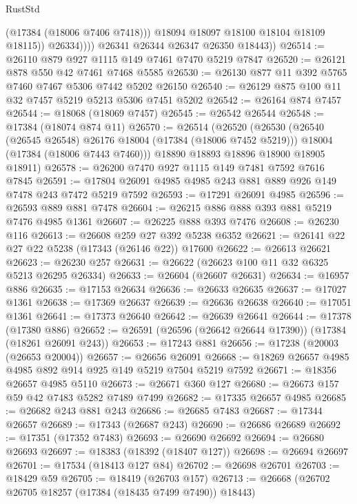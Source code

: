 \begin{lexlean}{RustStd}
\begin{coremodule}
                      (@17384 (@18006 @7406 @7418)))
                    @18094
                    @18097
                    @18100
                    @18104
                    @18109
                    @18115))
                @26334))))
        @26341
        @26344
        @26347
        @26350
        @18443))
@26514 := @26110 @879 @927 @1115 @149 @7461 @7470 @5219 @7847
@26520 := @26121 @878 @550 @42 @7461 @7468 @5585
@26530 := @26130 @877 @11 @392 @5765 @7460 @7467 @5306 @7442 @5202 @26150
@26540 := @26129 @875 @100 @11 @32 @7457 @5219 @5213 @5306 @7451 @5202
@26542 := @26164 @874 @7457
@26544 := @18068 (@18069 @7457)
@26545 := @26542 @26544
@26548 := @17384 (@18074 @874 @11)
@26570 := @26514
    (@26520
      (@26530
        (@26540 (@26545 @26548) @26176 @18004 (@17384 (@18006 @7452 @5219)))
        @18004
        (@17384 (@18006 @7443 @7460)))
      @18890
      @18893
      @18896
      @18900
      @18905
      @18911)
@26578 := @26200 @7470 @927 @1115 @149 @7481 @7592 @7616 @7845
@26591 := @17804 @26091 @4985 @4985 @243 @881 @889 @926 @149 @7478 @243 @7472 @5219 @7592
@26593 := @17291 @26091 @4985
@26596 := @26593 @889 @881 @7478
@26604 := @26215 @886 @888 @393 @881 @5219 @7476 @4985 @1361
@26607 := @26225 @888 @393 @7476
@26608 := @26230 @116
@26613 := @26608 @259 @27 @392 @5238 @6352
@26621 := @26141 @22 @27 @22 @5238 (@17343 (@26146 @22)) @17600
@26622 := @26613 @26621
@26623 := @26230 @257
@26631 := @26622 (@26623 @100 @11 @32 @6325 @5213 @26295 @26334)
@26633 := @26604 (@26607 @26631)
@26634 := @16957 @886
@26635 := @17153 @26634
@26636 := @26633 @26635
@26637 := @17027 @1361
@26638 := @17369 @26637
@26639 := @26636 @26638
@26640 := @17051 @1361
@26641 := @17373 @26640
@26642 := @26639 @26641
@26644 := @17378 (@17380 @886)
@26652 := @26591 (@26596 (@26642 @26644 @17390)) (@17384 (@18261 @26091 @243))
@26653 := @17243 @881
@26656 := @17238 (@20003 (@26653 @20004))
@26657 := @26656 @26091
@26668 := @18269 @26657 @4985 @4985 @892 @914 @925 @149 @5219 @7504 @5219 @7592
@26671 := @18356 @26657 @4985 @5110
@26673 := @26671 @360 @127
@26680 := @26673 @157 @59 @42 @7483 @5282 @7489 @7499
@26682 := @17335 @26657 @4985
@26685 := @26682 @243 @881 @243
@26686 := @26685 @7483
@26687 := @17344 @26657
@26689 := @17343 (@26687 @243)
@26690 := @26686 @26689
@26692 := @17351 (@17352 @7483)
@26693 := @26690 @26692
@26694 := @26680 @26693
@26697 := @18383 (@18392 (@18407 @127))
@26698 := @26694 @26697
@26701 := @17534 (@18413 @127 @84)
@26702 := @26698 @26701
@26703 := @18429 @59
@26705 := @18419 (@26703 @157)
@26713 := @26668 (@26702 @26705 @18257 (@17384 (@18435 @7499 @7490)) @18443)

\end{coremodule}
\end{lexlean}
